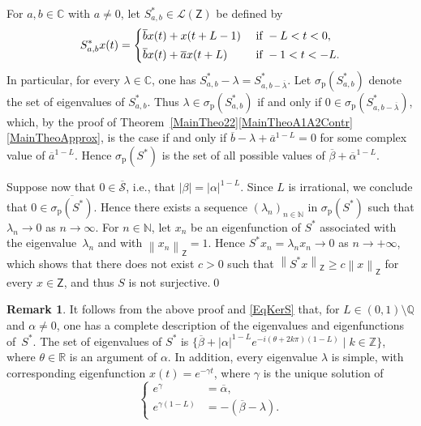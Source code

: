 \documentclass[10pt]{article}
\newcommand{\ie}{i.e.,\xspace}
\theoremstyle{plain}
\theoremstyle{definition}
\newtheorem{remk}[theo]{Remark}
\newcommand{\norm}[1]{\left\lVert #1\right\lVert}
\newcommand{\abs}[1]{\left\lvert #1\right \rvert}
\numberwithin{equation}{section}\numberwithin{figure}{section}\emergencystretch=3em
\begin{document}
For $a, b \in \mathbb C$ with $a \neq 0$, let $S_{a, b}^\ast \in \mathcal L(\mathsf Z)$ be defined by
\[
S_{a, b}^\ast x(t) =
\begin{dcases}
\overline b x(t) + x(t + L - 1) & \text{ if } -L < t < 0, \\
\overline b x(t) + \overline a x(t + L) & \text{ if } -1 < t < -L.
\end{dcases}
\]
In particular, for every $\lambda \in \mathbb C$, one has $S_{a, b}^\ast - \lambda = S_{a, b - \overline\lambda}^\ast$. Let $\sigma_{\mathrm p}(S_{a, b}^\ast)$ denote the set of eigenvalues of $S_{a, b}^\ast$. Thus $\lambda \in \sigma_{\mathrm p}(S_{a, b}^\ast)$ if and only if $0 \in \sigma_{\mathrm p}(S_{a, b - \overline\lambda}^\ast)$, which, by the proof of Theorem~\ref{MainTheo22}\eqref{MainTheoA1A2Contr}\eqref{MainTheoApprox}, is the case if and only if $\overline b - \lambda + \overline a^{1-L} = 0$ for some complex value of $\overline a^{1-L}$. Hence $\sigma_{\mathrm p}(S^\ast)$ is the set of all possible values of $\overline\beta + \overline\alpha^{1-L}$.

Suppose now that $0 \in \overline{\mathcal S}$, \ie that $\abs{\beta} = \abs{\alpha}^{1-L}$. Since $L$ is irrational, we conclude that $0 \in \overline{\sigma_{\mathrm p}(S^\ast)}$. Hence there exists a sequence $(\lambda_n)_{n \in \mathbb N}$ in $\sigma_{\mathrm p}(S^\ast)$ such that $\lambda_n \to 0$ as $n \to \infty$. For $n \in \mathbb N$, let $x_n$ be an eigenfunction of $S^\ast$ associated with the eigenvalue~$\lambda_n$ and with $\norm{x_n}_{\mathsf Z} = 1$. Hence $S^\ast x_n = \lambda_n x_n \to 0$ as $n \to +\infty$, which shows that there does not exist $c > 0$ such that $\norm{S^\ast x}_{\mathsf Z} \geq c \norm{x}_{\mathsf Z}$ for every $x \in \mathsf Z$, and thus $S$ is not surjective.\qed

\begin{remk}
\label{RemkEigenpairsS}
It follows from the above proof and \eqref{EqKerS} that, for $L \in (0, 1) \setminus \mathbb Q$ and $\alpha \neq 0$, one has a complete description of the eigenvalues and eigenfunctions of~$S^\ast$. The set of eigenvalues of $S^\ast$ is $\{\overline\beta + \abs{\alpha}^{1 - L} e^{- i (\theta + 2 k \pi)(1 - L)} \mid k \in \mathbb Z\}$, where $\theta \in \mathbb R$ is an argument of $\alpha$. In addition, every eigenvalue $\lambda$ is simple, with corresponding eigenfunction $x(t) = e^{- \gamma t}$, where $\gamma$ is the unique solution of
\[
\left\{
\begin{aligned}
e^{\gamma} & = \overline\alpha, \\
e^{\gamma(1 - L)} & = - (\overline\beta - \lambda).
\end{aligned}
\right.
\]
\end{remk}
\end{document}
